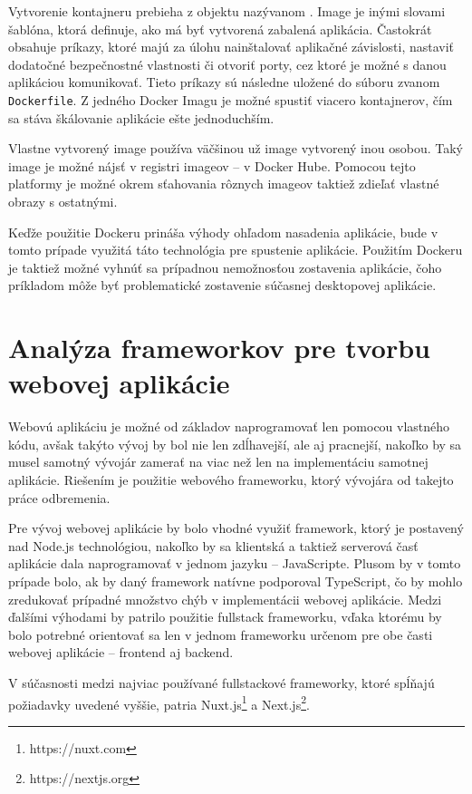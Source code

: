 Vytvorenie kontajneru prebieha z objektu nazývanom . Image je inými slovami šablóna, ktorá definuje, ako má byť vytvorená zabalená aplikácia. Častokrát obsahuje príkazy, ktoré majú za úlohu nainštalovať aplikačné závislosti, nastaviť dodatočné bezpečnostné vlastnosti či otvoriť porty, cez ktoré je možné s danou aplikáciou komunikovať. Tieto príkazy sú následne uložené do súboru zvanom \texttt{Dockerfile}. Z jedného Docker Imagu je možné spustiť viacero kontajnerov, čím sa stáva škálovanie aplikácie ešte jednoduchším.

Vlastne vytvorený image používa väčšinou už image vytvorený inou osobou. Taký image je možné nájsť v registri imageov -- v Docker Hube. Pomocou tejto platformy je možné okrem sťahovania rôznych imageov taktiež zdieľať vlastné obrazy s ostatnými.

Keďže použitie Dockeru prináša výhody ohľadom nasadenia aplikácie, bude v tomto prípade využitá táto technológia pre spustenie aplikácie. Použitím Dockeru je taktiež možné vyhnúť sa prípadnou nemožnosťou zostavenia aplikácie, čoho príkladom môže byť problematické zostavenie súčasnej desktopovej aplikácie.

\section {Analýza frameworkov pre tvorbu webovej aplikácie}
Webovú aplikáciu je možné od základov naprogramovať len pomocou vlastného kódu, avšak takýto vývoj by bol nie len zdĺhavejší, ale aj pracnejší, nakoľko by sa musel samotný vývojár zamerať na viac než len na implementáciu samotnej aplikácie. Riešením je použitie webového frameworku, ktorý vývojára od takejto práce odbremenia. 

Pre vývoj webovej aplikácie by bolo vhodné využiť framework, ktorý je postavený nad Node.js technológiou, nakoľko by sa klientská a taktiež serverová časť aplikácie dala naprogramovať v jednom jazyku -- JavaScripte. Plusom by v tomto prípade bolo, ak by daný framework natívne podporoval TypeScript, čo by mohlo zredukovať prípadné množstvo chýb v implementácii webovej aplikácie.
Medzi ďalšími výhodami by patrilo použitie fullstack frameworku, vďaka ktorému by bolo potrebné orientovať sa len v jednom frameworku určenom pre obe časti webovej aplikácie -- frontend aj backend.

V súčasnosti medzi najviac používané fullstackové frameworky, ktoré \newline spĺňajú požiadavky uvedené vyššie, patria Nuxt.js\footnote{https://nuxt.com} a Next.js\footnote{https://nextjs.org}.

